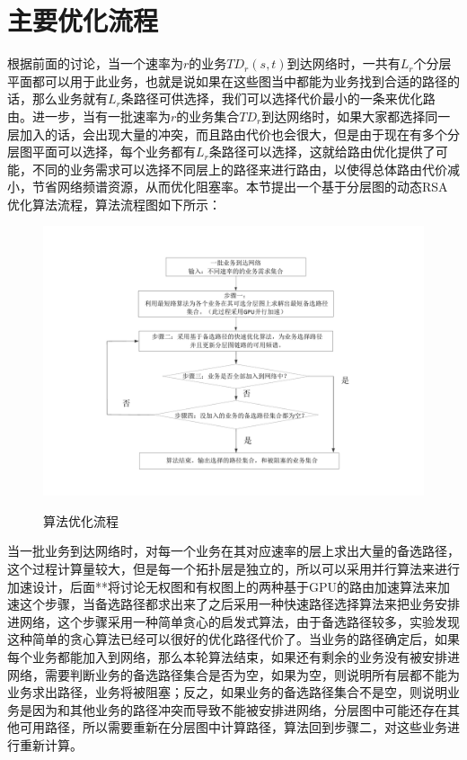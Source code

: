 \section{主要优化流程}
  根据前面的讨论，当一个速率为$r$的业务$TD_r(s,t)$到达网络时，一共有$L_r$个分层平面都可以用于此业务，也就是说如果在这些图当中都能为业务找到合适的路径的话，那么业务就有$L_r$条路径可供选择，我们可以选择代价最小的一条来优化路由。进一步，当有一批速率为$r$的业务集合$TD_r$到达网络时，如果大家都选择同一层加入的话，会出现大量的冲突，而且路由代价也会很大，但是由于现在有多个分层图平面可以选择，每个业务都有$L_r$条路径可以选择，这就给路由优化提供了可能，不同的业务需求可以选择不同层上的路径来进行路由，以使得总体路由代价减小，节省网络频谱资源，从而优化阻塞率。本节提出一个基于分层图的动态RSA优化算法流程，算法流程图如下所示：
 \begin{figure}
\setlength{\belowcaptionskip}{-0.5cm}
  \begin{center}
    {\includegraphics[width=1 \textwidth]{figures/bbprocess.pdf}}
    \end{center}
  \caption{{\footnotesize{算法优化流程}}}
  \label{bblayer}
\end{figure}
 当一批业务到达网络时，对每一个业务在其对应速率的层上求出大量的备选路径，这个过程计算量较大，但是每一个拓扑层是独立的，所以可以采用并行算法来进行加速设计，后面**将讨论无权图和有权图上的两种基于GPU的路由加速算法来加速这个步骤，当备选路径都求出来了之后采用一种快速路径选择算法来把业务安排进网络，这个步骤采用一种简单贪心的启发式算法，由于备选路径较多，实验发现这种简单的贪心算法已经可以很好的优化路径代价了。当业务的路径确定后，如果每个业务都能加入到网络，那么本轮算法结束，如果还有剩余的业务没有被安排进网络，需要判断业务的备选路径集合是否为空，如果为空，则说明所有层都不能为业务求出路径，业务将被阻塞；反之，如果业务的备选路径集合不是空，则说明业务是因为和其他业务的路径冲突而导致不能被安排进网络，分层图中可能还存在其他可用路径，所以需要重新在分层图中计算路径，算法回到步骤二，对这些业务进行重新计算。
